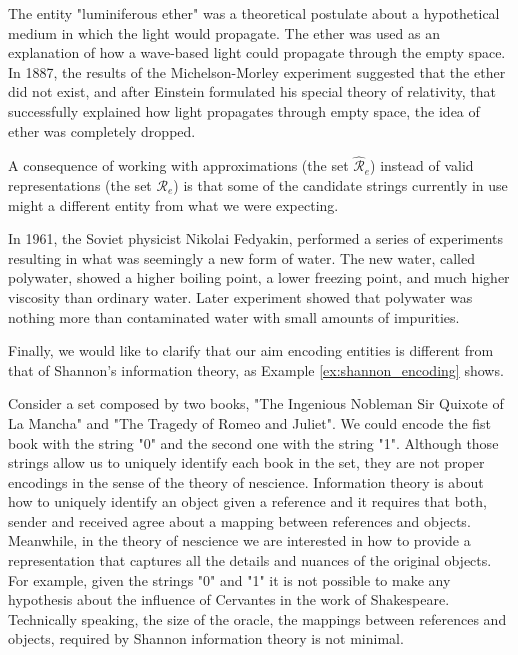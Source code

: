 \begin{example}
\label{ex:luminiferous_ether}
The entity "luminiferous ether" was a theoretical postulate about a hypothetical medium in which the light would propagate. The ether was used as an explanation of how a wave-based light could propagate through the empty space. In 1887, the results of the Michelson-Morley experiment suggested that the ether did not exist, and after Einstein formulated his special theory of relativity, that successfully explained how light propagates through empty space, the idea of ether was completely dropped.
\end{example}

A consequence of working with approximations (the set $\hat{\mathcal{R}}_e$) instead of valid representations (the set $\mathcal{R}_e$) is that some of the candidate strings currently in use might a different entity from what we were expecting.

\begin{example}
In 1961, the Soviet physicist Nikolai Fedyakin, performed a series of experiments resulting in what was seemingly a new form of water. The new water, called polywater, showed a higher boiling point, a lower freezing point, and much higher viscosity than ordinary water. Later experiment showed that polywater was nothing more than contaminated water with small amounts of impurities.
\end{example}

Finally, we would like to clarify that our aim encoding entities is different from that of Shannon's information theory, as Example \ref{ex:shannon_encoding} shows.

\begin{example}
\label{ex:shannon_encoding}
Consider a set composed by two books, "The Ingenious Nobleman Sir Quixote of La Mancha" and "The Tragedy of Romeo and Juliet". We could encode the fist book with the string "0" and the second one with the string "1". Although those strings allow us to uniquely identify each book in the set, they are not proper encodings in the sense of the theory of nescience. Information theory is about how to uniquely identify an object given a reference and it requires that both, sender and received agree about a mapping between references and objects. Meanwhile, in the theory of nescience we are interested in how to provide a representation that captures all the details and nuances of the original objects. For example, given the strings "0" and "1" it is not possible to make any hypothesis about the influence of Cervantes in the work of Shakespeare. Technically speaking, the size of the oracle, the mappings between references and objects, required by Shannon information theory is not minimal.
\end{example}

